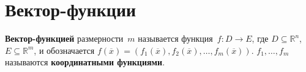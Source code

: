 \section{Вектор-функции}
 \textbf{Вектор-функцией} размерности~$m$ называется функция~$f \colon D \to E$, где $D \subseteq \mathbb R^n$, $E \subseteq \mathbb R^m$, и обозначается
$f(\overline x) = (f_1(\overline x), f_2(\overline x), \ldots, f_m(\overline x))$.
$f_1, \ldots, f_m$ называются \textbf{координатными функциями}.